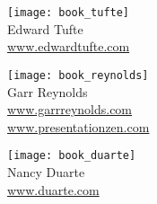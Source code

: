 \documentclass[t]{beamer}
\begin{document}
%


\begin{frame}
\begin{multicols}{3}

\texttt{[image: book\_tufte]}\\
Edward Tufte \\
\href{https://www.edwardtufte.com/tufte/}{www.edwardtufte.com}

\columnbreak

\texttt{[image: book\_reynolds]}\\
Garr Reynolds\\
\href{https://www.garrreynolds.com}{www.garrreynolds.com}\\
\href{https://www.presentationzen.com}{www.presentationzen.com}


\columnbreak

\texttt{[image: book\_duarte]}\\
Nancy Duarte\\
\href{https://www.duarte.com}{www.duarte.com}

\end{multicols}
\end{frame}

%

{\usebackgroundtemplate{\texttt{[image: q\_a]}}
\begin{frame}
\end{frame}
}

%
\end{document}
